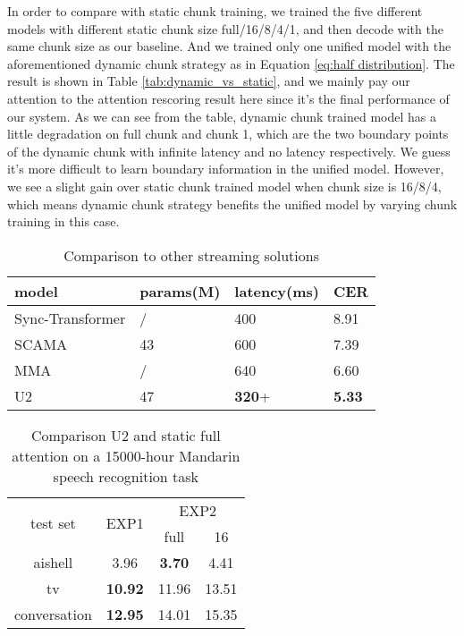 \documentclass[a4paper]{article}
\begin{document}
In order to compare with static chunk training, we trained the five different models with different static chunk size full/16/8/4/1, and then decode with the same chunk size as our baseline. And we trained only one unified model with the aforementioned dynamic chunk strategy as in Equation \ref{eq:half distribution}. The result is shown in Table \ref{tab:dynamic_vs_static}, and we mainly pay our attention to the attention rescoring result here since it's the final performance of our system. As we can see from the table, dynamic chunk trained model has a little degradation on full chunk and chunk 1, which are the two boundary points of the dynamic chunk with infinite latency and no latency respectively. We guess it's more difficult to learn boundary information in the unified model.
However, we see a slight gain over static chunk trained model when chunk size is 16/8/4, which means dynamic chunk strategy benefits the unified model by varying chunk training in this case. 
\begin{table}[h]
    \setlength{\abovecaptionskip}{0.1cm}
    \centering
    \caption{Comparison to other streaming solutions}
    \label{tab:solution_comparison}
    \begin{tabular}{llll}
    \toprule
    model            & params(M) & latency(ms) & CER  \\ \midrule
    Sync-Transformer\cite{tian2020synchronous} & /      & 400   & 8.91 \\
    SCAMA\cite{zhang2020streaming}            & 43    & 600   & 7.39 \\
    MMA\cite{inaguma2020enhancing}              & /      & 640   & 6.60  \\
    U2          & 47    & \textbf{320}+  & \textbf{5.33} \\ \bottomrule
    \end{tabular}
    \vspace{-1.5em}
\end{table}

\begin{table}[t]
    \centering
    \setlength{\abovecaptionskip}{0.1cm}
    \caption{Comparison U2 and static full attention on a 15000-hour Mandarin speech recognition task}
    \label{tab:15000 hour}
    \begin{tabular}{c c c c }
    \hline
    \multirow{2}{*}{test set}  &
    \multirow{2}{*}{EXP1} & \multicolumn{2}{c}{EXP2} \\ \cline{3-4} 
                                                                    &                                & full   & 16          \\ \hline
    \multirow{1}{*}{aishell}  
                                                                    & 3.96            & \textbf{3.70}   & 4.41    \\ \hline
    \multirow{1}{*}{tv}     & \textbf{10.92}            & 11.96   & 13.51    \\ \hline
    \multirow{1}{*}{conversation}     & \textbf{12.95}            & 14.01   & 15.35    \\ \hline
    \end{tabular}\vspace{-1.5em}
\end{table}
\end{document}
